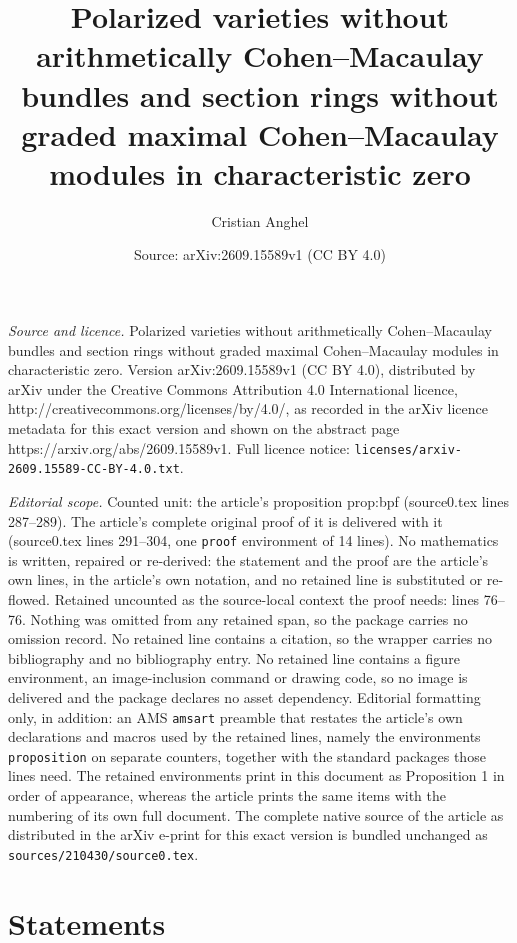 \documentclass[10pt,a4paper]{amsart}
\title{Polarized varieties without arithmetically Cohen--Macaulay bundles and section rings without graded maximal Cohen--Macaulay modules in characteristic zero}
\author{Cristian Anghel}
\date{Source: arXiv:2609.15589v1 (CC BY 4.0)}
\begin{document}
\maketitle

\noindent\emph{Source and licence.} Polarized varieties without arithmetically Cohen--Macaulay bundles and section rings without graded maximal Cohen--Macaulay modules in characteristic zero. Version arXiv:2609.15589v1 (CC BY 4.0), distributed by arXiv under the Creative Commons Attribution 4.0 International licence, http://creativecommons.org/licenses/by/4.0/, as recorded in the arXiv licence metadata for this exact version and shown on the abstract page https://arxiv.org/abs/2609.15589v1. Full licence notice: \texttt{licenses/arxiv-2609.15589-CC-BY-4.0.txt}.\par\smallskip

\noindent\textit{Editorial scope.} Counted unit: the article's proposition prop:bpf (source0.tex lines 287--289). The article's complete original proof of it is delivered with it (source0.tex lines 291--304, one \texttt{proof} environment of 14 lines). No mathematics is written, repaired or re-derived: the statement and the proof are the article's own lines, in the article's own notation, and no retained line is substituted or re-flowed.  Retained uncounted as the source-local context the proof needs: lines 76--76.  Nothing was omitted from any retained span, so the package carries no omission record.  No retained line contains a citation, so the wrapper carries no bibliography and no bibliography entry.  No retained line contains a figure environment, an image-inclusion command or drawing code, so no image is delivered and the package declares no asset dependency.  Editorial formatting only, in addition: an AMS \texttt{amsart} preamble that restates the article's own declarations and macros used by the retained lines, namely the environments \texttt{proposition} on separate counters, together with the standard packages those lines need.  The retained environments print in this document as Proposition 1 in order of appearance, whereas the article prints the same items with the numbering of its own full document.  The complete native source of the article as distributed in the arXiv e-print for this exact version is bundled unchanged as \texttt{sources/210430/source0.tex}.
\section{Statements}\label{sec:statements}
\end{document}
